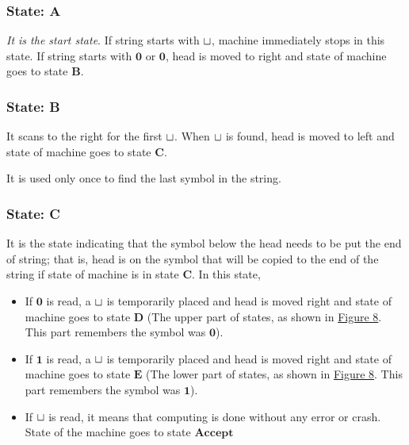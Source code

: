 \subsubsection*{State: A}
\label{q2-state:initial}

\textit{It is the start state}. If string starts with $\sqcup$, machine immediately stops in this state. If string starts with $\mathbf{0}$ or $\mathbf{0}$, head is moved to right and state of machine goes to state \hyperref[q2-state:B]{$\mathbf{B}$}.

\subsubsection*{State: B}
\label{q2-state:B}

It scans to the right for the first $\sqcup$. When $\sqcup$ is found, head is moved to left and state of machine goes to state \hyperref[q2-state:C]{$\mathbf{C}$}. 

It is used only once to find the last symbol in the string.

\subsubsection*{State: C}
\label{q2-state:C}

It is the state indicating that the symbol below the head needs to be put the end of string; that is, head is on the symbol that will be copied to the end of the string if state of machine is in state \hyperref[q2-state:C]{$\mathbf{C}$}. In this state,
\begin{itemize}
  \item If $\mathbf{0}$ is read, a $\sqcup$ is temporarily placed and head is moved right and state of machine goes to state \hyperref[q2-state:D]{$\mathbf{D}$} (The upper part of states, as shown in \hyperref[fig:q2-machine]{Figure 8}. This part remembers the symbol was $\mathbf{0}$).
  \item If $\mathbf{1}$ is read, a $\sqcup$ is temporarily placed and head is moved right and state of machine goes to state \hyperref[q2-state:E]{$\mathbf{E}$} (The lower part of states, as shown in \hyperref[fig:q2-machine]{Figure 8}. This part remembers the symbol was $\mathbf{1}$).
  \item If $\sqcup$ is read, it means that computing is done without any error or crash. State of the machine goes to state \hyperref[q2-state:Accept]{$\mathbf{Accept}$}
\end{itemize}

